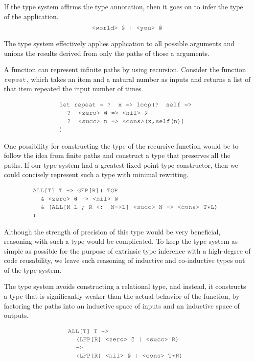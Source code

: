 \documentclass[acmsmall]{acmart}
\theoremstyle{definition}
\begin{document}
If the type system affirms the type annotation,
then it goes on to infer the type of the application. 
\[
  \J{<world> @ | <you> @}
\]

The type system effectively applies application to all possible arguments
and unions the results derived from only the paths of those a arguments. 

A function can represent infinite paths by using recursion.
Consider the function $\J{repeat}$, which takes an item and a natural number
as inputs and returns a list of that item repeated the input number of times.

\[
  \begin{array}[t]{@{} l}
      \J{let repeat = ? x => loop(? self =>}
      \\
      \I \J{? <zero> @ => <nil> @}
      \\
      \I \J{? <succ> n => <cons>(x,self(n))}
      \\
      \J{)}
  \end{array}
\]

One possibility for constructing the type of the recursive function would
be to follow the idea from finite paths and construct a type 
that preserves all the paths. If our type system had a greatest fixed point
type constructor, then we could concisely represent such a type with minimal
rewriting.

\[
  \begin{array}[t]{@{} l}
      \J{ALL[T] T -> GFP[R]( TOP} 
      \\
      \I \J{\& <zero> @ -> <nil> @}
      \\
      \I \J{\& (ALL[N L ; R <: N->L] <succ> N -> <cons> T*L)}
      \\
      \J{)} 
  \end{array}
\]

Although the strength of precision of this type would be very beneficial,
reasoning with such a type would be complicated. To keep the type system as
simple as possible for the purpose of extrinsic type inference with a high-degree
of code reusability, we leave such reasoning of inductive and co-inductive types out of
the type system. 

The type system avoids constructing a relational type, and instead, it
constructs a type that is significantly weaker than the actual behavior of the function,
by factoring the paths into an inductive space of inputs and an inductive space of outputs. 

\[
  \begin{array}[t]{@{} l}
      \J{ALL[T] T ->} 
      \\
      \I \J{(LFP[R] <zero> @ | <succ> R)}
      \\
      \I \J{->}
      \\
      \I \J{(LFP[R] <nil> @ | <cons> T*R)}
  \end{array}
\]
\end{document}

